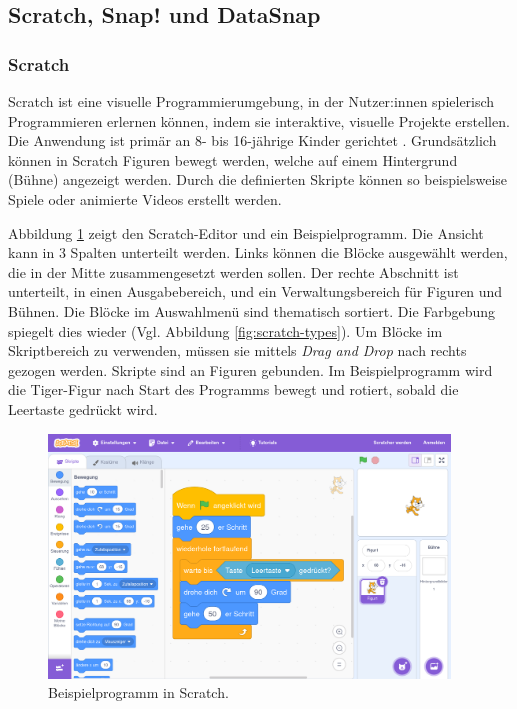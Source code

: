 \subsection{Scratch, Snap! und DataSnap}
\subsubsection{Scratch}
Scratch ist eine visuelle Programmierumgebung, in der Nutzer:innen spielerisch Programmieren erlernen können, indem sie interaktive, visuelle Projekte erstellen. Die Anwendung ist primär an 8- bis 16-jährige Kinder gerichtet \parencite{maloneyScratchProgramming2010}. Grundsätzlich können in Scratch Figuren bewegt werden, welche auf einem Hintergrund (Bühne) angezeigt werden. Durch die definierten Skripte können so beispielsweise Spiele oder animierte Videos erstellt werden.

Abbildung \ref{fig:scratch} zeigt den Scratch-Editor und ein Beispielprogramm. Die Ansicht kann in 3 Spalten unterteilt werden. Links können die Blöcke ausgewählt werden, die in der Mitte zusammengesetzt werden sollen. Der rechte Abschnitt ist unterteilt, in einen Ausgabebereich, und ein Verwaltungsbereich für Figuren und Bühnen. Die Blöcke im Auswahlmenü sind thematisch sortiert. Die Farbgebung spiegelt dies wieder (Vgl. Abbildung \ref{fig:scratch-types}). Um Blöcke im Skriptbereich zu verwenden, müssen sie mittels \textit{Drag and Drop} nach rechts gezogen werden. Skripte sind an Figuren gebunden. Im Beispielprogramm wird die Tiger-Figur nach Start des Programms bewegt und rotiert, sobald die Leertaste gedrückt wird.
\parencite{maloneyScratchProgramming2010}

\begin{figure}[!ht]
  \begin{center}
    \includegraphics[width=0.95\textwidth]{assets/scratch.png}
  \end{center}
  \caption{Beispielprogramm in Scratch. \parencite{scratchfoundationScratch}}
  \label{fig:scratch}
\end{figure}

